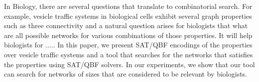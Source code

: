 In Biology, there are several questions that translate to combinatorial 
search.
%
For example, vesicle traffic systems in biological cells exhibit
several graph properties such as three connectivity and
a natural question arises for biologists that what are all possible
networks for various combinations of those properties.
%
It will help biologists for .....
%
In this paper, we present SAT/QBF encodings of the properties over
vesicle traffic systems and a tool that searches for the networks
that satisfies the properties using SAT/QBF solvers.
%
In our experiments, we show that our tool can search for networks of
sizes that are considered to be relevant by biologists.



